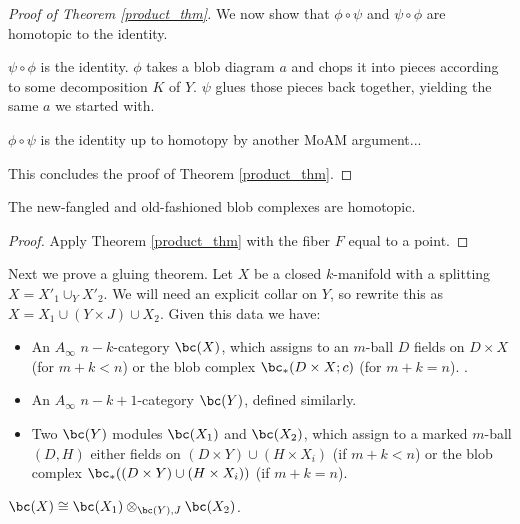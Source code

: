 \begin{proof}[Proof of Theorem \ref{product_thm}]

We now show that $\phi\circ\psi$ and $\psi\circ\phi$ are homotopic to the identity.

$\psi\circ\phi$ is the identity.  $\phi$ takes a blob diagram $a$ and chops it into pieces 
according to some decomposition $K$ of $Y$.
$\psi$ glues those pieces back together, yielding the same $a$ we started with.

$\phi\circ\psi$ is the identity up to homotopy by another MoAM argument...

This concludes the proof of Theorem \ref{product_thm}.
\end{proof}


\medskip

\begin{cor}
The new-fangled and old-fashioned blob complexes are homotopic.
\end{cor}
\begin{proof}
Apply Theorem \ref{product_thm} with the fiber $F$ equal to a point.
\end{proof}

\medskip

Next we prove a gluing theorem.
Let $X$ be a closed $k$-manifold with a splitting $X = X'_1\cup_Y X'_2$.
We will need an explicit collar on $Y$, so rewrite this as
$X = X_1\cup (Y\times J) \cup X_2$.
Given this data we have: 
\begin{itemize}
\item An $A_\infty$ $n{-}k$-category $\bc(X)$, which assigns to an $m$-ball
$D$ fields on $D\times X$ (for $m+k < n$) or the blob complex $\bc_*(D\times X; c)$
(for $m+k = n$). .
\item An $A_\infty$ $n{-}k{+}1$-category $\bc(Y)$, defined similarly.
\item Two $\bc(Y)$ modules $\bc(X_1)$ and $\bc(X_2)$, which assign to a marked
$m$-ball $(D, H)$ either fields on $(D\times Y) \cup (H\times X_i)$ (if $m+k < n$)
or the blob complex $\bc_*((D\times Y) \cup (H\times X_i))$ (if $m+k = n$).
\end{itemize}

\begin{thm}
$\bc(X) \cong \bc(X_1) \otimes_{\bc(Y), J} \bc(X_2)$.
\end{thm}

